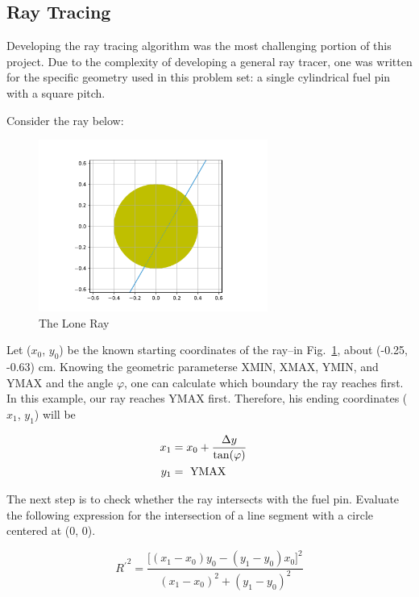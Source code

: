 \documentclass[12pt]{article}
\begin{document}
\newpage

\subsection{Ray Tracing}\label{sec:raytracing}

Developing the ray tracing algorithm was the most challenging portion of this project. Due to the complexity of developing a general ray tracer, one was written for the specific geometry used in this problem set: a single cylindrical fuel pin with a square pitch. 

Consider the ray below: 

\begin{figure}[h]
\centering
\includegraphics[width=0.67\textwidth]{figs/SingleRay.pdf}
\caption{The Lone Ray}
\label{fig:singleray}
\end{figure}

Let ($x_0$, $y_0$) be the known starting coordinates of the ray--in Fig.~\ref{fig:singleray}, about (-0.25, -0.63) cm. Knowing the geometric parameterse XMIN, XMAX, YMIN, and YMAX and the angle $\varphi$, one can calculate which boundary the ray reaches first. In this example, our ray reaches YMAX first. Therefore, his ending coordinates ($x_1$, $y_1$) will be

\begin{align}\label{eq:x1y1}
x_1 &= x_0 + \frac{\Delta y}{\tan(\varphi)}
\cr
y_1 &= \text{ YMAX}
\end{align}

The next step is to check whether the ray intersects with the fuel pin. Evaluate the following expression for the intersection of a line segment with a circle centered at (0, 0).

\begin{equation}\label{eq:intersection}
R{^\prime}^2 = \frac{ \big[
(x_1 - x_0) y_0 - (y_1 - y_0) x_0
\big]^2 }{ 
(x_1 - x_0)^2 + (y_1 - y_0)^2  }
\end{equation} 
\end{document}
